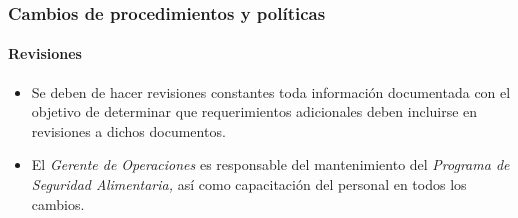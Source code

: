 \subsubsection{Cambios de procedimientos y políticas}

\paragraph{Revisiones}
\begin{itemize}
	\item Se deben de hacer revisiones constantes toda información documentada con el objetivo de determinar que requerimientos adicionales deben incluirse en revisiones a dichos documentos. 
	\item El \emph{Gerente de Operaciones} es responsable del mantenimiento del \emph{Programa de Seguridad Alimentaria,} así como capacitación del personal en todos los cambios.
\end{itemize}

